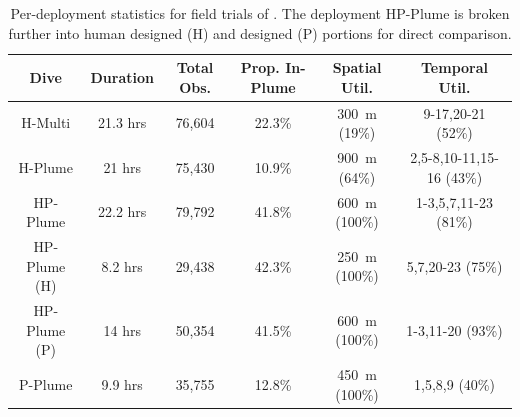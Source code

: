 \begin{table}[h!]
    \centering
    \begin{tabular}{c|c|c|c|c|c}
        Dive & Duration & Total Obs. & Prop. In-Plume & Spatial Util. & Temporal Util.  \\
        \hline
        H-Multi & 21.3 hrs & 76,604 & 22.3\% & \SI{300}{\meter} (19\%) & 9-17,20-21 (52\%) \\
        H-Plume & 21 hrs & 75,430 & 10.9\% & \SI{900}{\meter} (64\%) & 2,5-8,10-11,15-16 (43\%) \\
        \hline
        HP-Plume & 22.2 hrs & 79,792 & 41.8\% & \SI{600}{\meter} (100\%) & 1-3,5,7,11-23 (81\%) \\
        HP-Plume (H) & 8.2 hrs & 29,438 & 42.3\% & \SI{250}{\meter} (100\%) & 5,7,20-23 (75\%) \\
        HP-Plume (P) & 14 hrs & 50,354 & 41.5\% & \SI{600}{\meter} (100\%) &  1-3,11-20 (93\%)\\
        \hline
        P-Plume & 9.9 hrs & 35,755 & 12.8\% & \SI{450}{\meter} (100\%) & 1,5,8,9 (40\%)
    \end{tabular}
    \caption{Per-deployment statistics for field trials of \PHORTEX. The deployment HP-Plume is broken further into human designed (H) and \PHORTEX designed (P) portions for direct comparison.}
    \label{tab:field_results}
\end{table}

